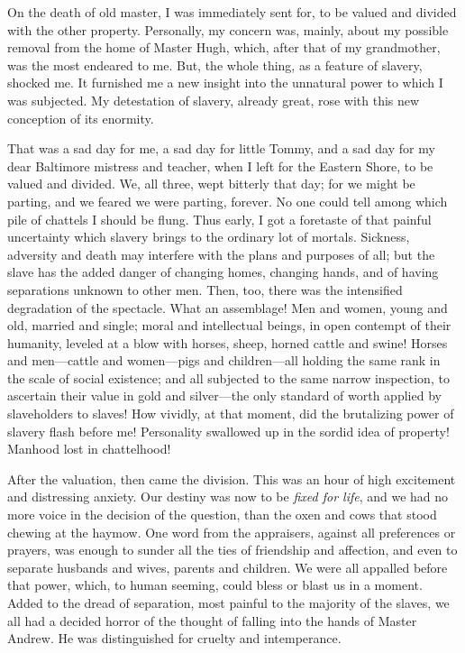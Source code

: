 On the death of old master, I was immediately sent for, to be valued and
divided with the other property. Personally, my concern was, mainly,
about my possible removal from the home of Master Hugh, which, after
that of my grandmother, was the most endeared to me. But, the whole
thing, as a feature of slavery, shocked me. It furnished me a new
insight into the unnatural power to which I was subjected. My
detestation of slavery, already great, rose with this new conception of
its enormity.

That was a sad day for me, a sad day for little Tommy, and a sad day for
my dear Baltimore mistress and teacher, when I left for the Eastern
Shore, to be valued and divided. We, all three, wept bitterly that
{}day; for we might be parting, and we feared we were parting, forever.
No one could tell among which pile of chattels I should be flung. Thus
early, I got a foretaste of that painful uncertainty which slavery
brings to the ordinary lot of mortals. Sickness, adversity and death may
interfere with the plans and purposes of all; but the slave has the
added danger of changing homes, changing hands, and of having
separations unknown to other men. Then, too, there was the intensified
degradation of the spectacle. What an assemblage! Men and women, young
and old, married and single; moral and intellectual beings, in open
contempt of their humanity, leveled at a blow with horses, sheep, horned
cattle and swine! Horses and men---cattle and women---pigs and
children---all holding the same rank in the scale of social existence;
and all subjected to the same narrow inspection, to ascertain their
value in gold and silver---the only standard of worth applied by
slaveholders to slaves! How vividly, at that moment, did the brutalizing
power of slavery flash before me! Personality swallowed up in the sordid
idea of property! Manhood lost in chattelhood!

After the valuation, then came the division. This was an hour of high
excitement and distressing anxiety. Our destiny was now to be
\emph{fixed for life}, and we had no more voice in the decision of the
question, than the oxen and cows that stood chewing at the haymow. One
word from the appraisers, against all preferences or prayers, was enough
to sunder all the ties of friendship and affection, and even to separate
husbands and wives, parents and children. We were all {}appalled before
that power, which, to human seeming, could bless or blast us in a
moment. Added to the dread of separation, most painful to the majority
of the slaves, we all had a decided horror of the thought of falling
into the hands of Master Andrew. He was distinguished for cruelty and
intemperance.

